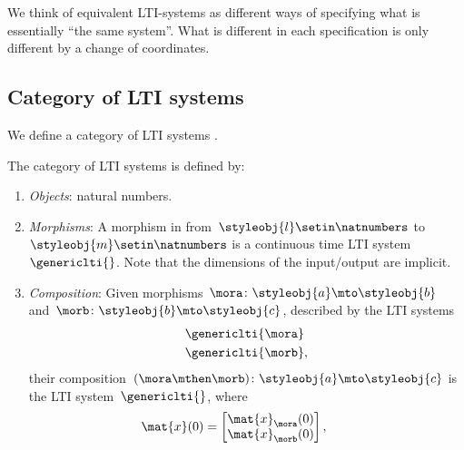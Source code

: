 We think of equivalent LTI-systems as different ways of specifying what is essentially ``the same system''. What is different in each specification is only different by a change of coordinates. 


\subsection{Category of LTI systems}

We define a category of LTI systems \LTI.

\begin{ctdefinition}
    \label{def:LTICat}
    The category  \iindex{\LTI} of LTI systems is defined by:
    \begin{enumerate}
        \item \emph{Objects}: natural numbers.
        \item \emph{Morphisms}: A morphism in \LTI from~$\styleobj{l}\setin \natnumbers$ to~$\styleobj{m}\setin \natnumbers$ is a continuous time LTI system~$\genericlti{}$.
              Note that the dimensions of the input/output are implicit.
        \item \emph{Composition}: Given morphisms~$\mora \colon \styleobj{a}\mto \styleobj{b}$ and~$\morb\colon \styleobj{b}\mto \styleobj{c}$, described by the LTI systems
              \begin{equation*}
                  \begin{aligned}
                       & \genericlti{\mora} \\
                       & \genericlti{\morb},
                  \end{aligned}
              \end{equation*}
              their composition~$(\mora \mthen \morb)\colon \styleobj{a}\mto \styleobj{c}$ is the LTI system~$\genericlti{}$, where
              \begin{equation}
                  \begin{aligned}
                      \mat{x}(0) & =\begin{bmatrix}
                                        \mat{x}_\mora(0) \\
                                        \mat{x}_\morb(0) \\
                                    \end{bmatrix},\quad

\end{aligned}
\end{equation}
\end{enumerate}
\end{ctdefinition}
